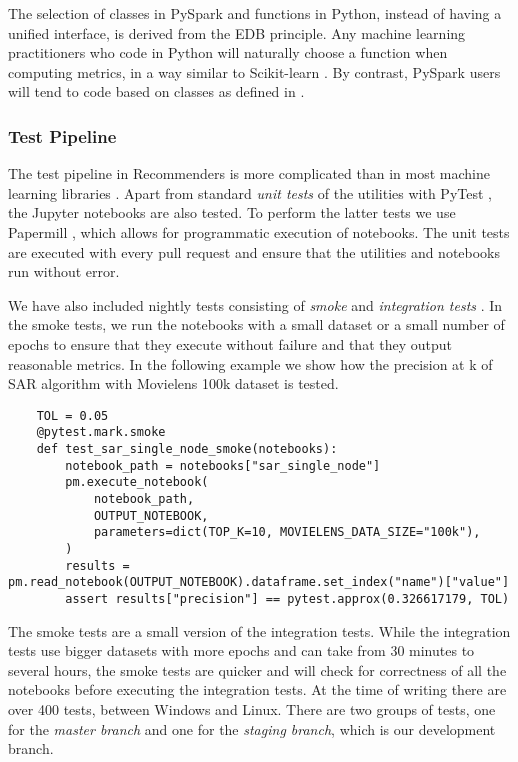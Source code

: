 The selection of classes in PySpark and functions in Python, instead of having a unified
interface, is derived from the EDB principle. Any machine learning practitioners
who code in Python will naturally choose a function when computing metrics, 
in a way similar to Scikit-learn \cite{pedregosa2011scikit}. By contrast, PySpark users 
will tend to code based on classes as defined in \cite{meng2016mllib}. 

\subsubsection{Test Pipeline}

The test pipeline in Recommenders is more complicated than in most machine learning
libraries \cite{abadi2016tensorflow,paszke2017automatic,pedregosa2011scikit,ke2017lightgbm}.
Apart from standard {\em unit tests} of the utilities with PyTest \cite{krekel2004pytest}, 
the Jupyter notebooks are also tested. To perform the latter tests we use Papermill 
\cite{nteract2017papermill}, which allows for programmatic execution of notebooks. The
unit tests are executed with every pull request and ensure that the utilities and 
notebooks run without error.

We have also included nightly tests consisting of {\em smoke} and {\em integration tests}
\cite{gonzalez-fierro2018beginners}. In the smoke tests, we run the notebooks with a 
small dataset or a small number of epochs to ensure that they execute without failure and that they 
output reasonable metrics. In the following example we show how 
the precision at k of SAR algorithm with Movielens 100k dataset is tested.

\begin{verbatim}
    TOL = 0.05
    @pytest.mark.smoke
    def test_sar_single_node_smoke(notebooks):
        notebook_path = notebooks["sar_single_node"]
        pm.execute_notebook(
            notebook_path,
            OUTPUT_NOTEBOOK,
            parameters=dict(TOP_K=10, MOVIELENS_DATA_SIZE="100k"),
        )
        results = pm.read_notebook(OUTPUT_NOTEBOOK).dataframe.set_index("name")["value"]
        assert results["precision"] == pytest.approx(0.326617179, TOL)
\end{verbatim}

The smoke tests are a small version of the integration tests. While the integration tests
use bigger datasets with more epochs and can take from 30 minutes to several hours, the smoke tests are quicker and
will check for correctness of all the notebooks before executing the integration tests.
At the time of writing there are over 400 tests, between Windows and Linux. There are two groups of tests,
one for the {\em master branch} and one for the {\em staging branch}, which is our development branch.

